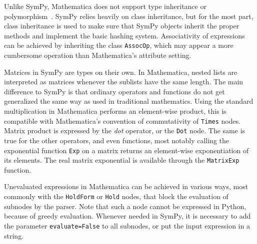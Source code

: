 

Unlike SymPy, Mathematica does not support type inheritance or poly\-morph\-ism~\cite{Fateman1992}.
%
SymPy relies heavily on class inheritance, but for the most part,
class inheritance is used to make sure that SymPy objects inherit the proper
methods and implement the basic hashing system.
Associativity of expressions can be achieved by inheriting the class \texttt{AssocOp},
which may appear a more cumbersome operation than Mathematica's attribute setting.


Matrices in SymPy are types on their own.
In Mathematica, nested lists are interpreted as matrices whenever the sublists
have the same length.
The main difference to SymPy is that ordinary operators and functions
do not get generalized the same way as used in traditional mathematics.
Using the standard multiplication in Mathematica performs an element-wise
product, this is compatible with Mathematica's convention of commutativity of
\texttt{Times} nodes.
Matrix product is expressed by the \textit{dot} operator,
or the \texttt{Dot} node.
The same is true for the other operators, and even functions,
most notably calling the exponential function \texttt{Exp} on a matrix
returns an element-wise exponentiation of its elements.
The real matrix exponential is available through the \texttt{MatrixExp}
function.


Unevaluated expressions in Mathematica can be achieved in various ways,
most commonly with the \texttt{HoldForm} or \texttt{Hold} nodes,
that block the evaluation of subnodes by the parser.
Note that such a node cannot be expressed in Python, because of greedy evaluation.
Whenever needed in SymPy, it is necessary to add the parameter \texttt{evaluate=False}
to all subnodes, or put the input expression in a string.


